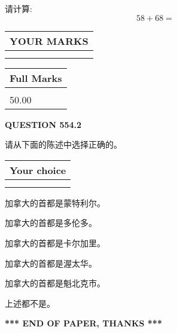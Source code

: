 \documentclass{ctexart}
\begin{document}
  
 
请计算:
\begin{equation}
58 +  %
68 = \nonumber
\end{equation}
 

 

 
  
\vspace{0.2in}
  
\noindent\begin{tabular}{|l|}
\hline
 YOUR MARKS  \\
\hline
 \\ 
 \\ 
\hline
\end{tabular}
\hspace{0.05in} \begin{tabular}{|l|}
\hline
 Full Marks  \\
\hline
 \\ 
50.00 \\
\hline
\end{tabular}
{\textbf{\Large{QUESTION
554.2 
}}}
  
  
请从下面的陈述中选择正确的。
  
  
\noindent\hspace{3.0in} \begin{tabular}{|l|}
\hline
Your choice \\
\hline
 \\ 
 \\ 
\hline
\end{tabular}
  
  
 
 
加拿大的首都是蒙特利尔。
 
 
加拿大的首都是多伦多。
 
 
加拿大的首都是卡尔加里。
 
 
加拿大的首都是渥太华。
 
 
加拿大的首都是魁北克市。
 
 
 上述都不是。
 
 
   
   
 \vspace{0.2in}
 
   
   
   
   
\vspace{1.0in} 
{\textbf{\large{ *** END OF PAPER, THANKS *** }}} 
   
\end{document}
